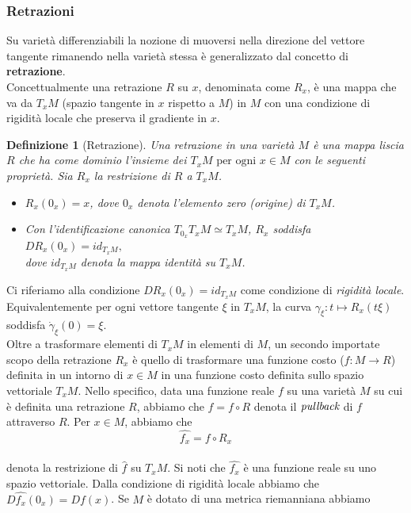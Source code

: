 \documentclass[a4paper, 12pt]{article}
\newtheorem{definition}{Definizione}
\begin{document}
\subsubsection{Retrazioni} \label{retraction}
Su varietà differenziabili la nozione di muoversi nella direzione del vettore tangente rimanendo nella varietà stessa è generalizzato dal concetto di \textbf{retrazione}.\\
Concettualmente una retrazione $R$ su $x$, denominata come $R_x$, è una mappa che va da $T_xM$ (spazio tangente in $x$ rispetto a $M$) in $M$ con una condizione di rigidità locale che preserva il gradiente in $x$.
\begin{definition}[Retrazione]
Una retrazione in una varietà $M$ è una mappa liscia $R$ che ha come dominio l'insieme dei $T_xM \mbox{ per ogni } x \in M$ con le seguenti proprietà. Sia $R_x$ la restrizione di $R$ a $T_xM$.
\begin{itemize}
  \item $R_x(0_x) = x$, dove $0_x$ denota l'elemento zero (origine) di $T_xM$.
  \item Con l'identificazione canonica $T_{0_x} T_xM \simeq T_xM$, $R_x$ soddisfa\\
  $DR_x(0_x) = id_{T_xM},$\\
  dove $id_{T_xM}$ denota la mappa identità su $T_xM$.
\end{itemize}
\end{definition}
Ci riferiamo alla condizione $DR_x(0_x) = id_{T_xM}$ come condizione di \emph{rigidità locale}. Equivalentemente per ogni vettore tangente $\xi$ in $T_xM$, la curva $\gamma_{\xi}:t \mapsto R_x(t\xi)$ soddisfa $\dot{\gamma}_{\xi}(0) = \xi$.\\
Oltre a trasformare elementi di $T_xM$ in elementi di $M$, un secondo importate scopo della retrazione $R_x$ è quello di trasformare una funzione costo ($f:M \to R$) definita in un intorno di $x \in M$ in una funzione costo definita sullo spazio vettoriale $T_xM$. Nello specifico, data una funzione reale $f$ su una varietà $M$ su cui è definita una retrazione $R$, abbiamo che $\hat{f} = f \circ R$ denota il $\emph{pullback}$ di $f$ attraverso $R$. Per $x \in M$, abbiamo che\\
\[\hat{f_x} = f \circ R_x\]\\
denota la restrizione di $\hat{f}$ su $T_xM$. Si noti che $\hat{f_x}$ è una funzione reale su uno spazio vettoriale. Dalla condizione di rigidità locale abbiamo che $D\hat{f_x}(0_x) = Df(x)$. Se $M$ è dotato di una metrica riemanniana abbiamo\\
\end{document}
